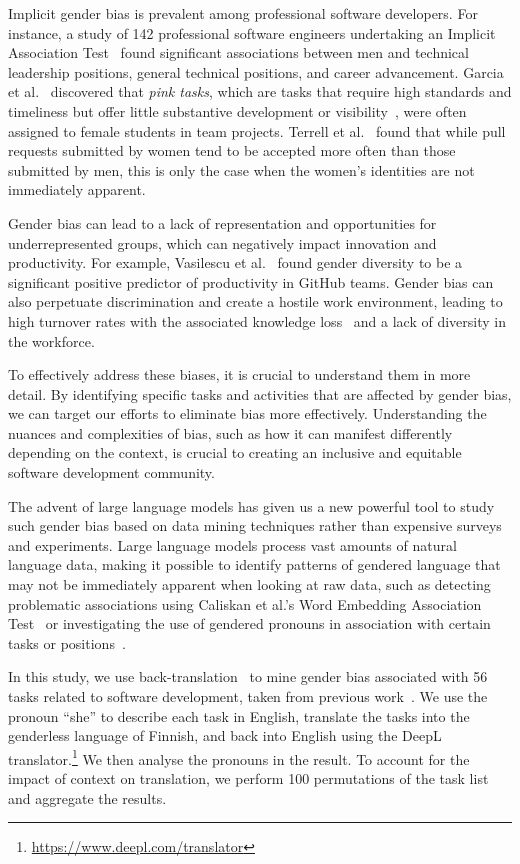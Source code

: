\documentclass[10pt,conference]{IEEEtran}
\begin{document}
\begin{sloppy}
Implicit gender bias is prevalent among professional software developers. For instance, a study of 142 professional software engineers undertaking an Implicit Association Test~\cite{wang2019implicit} found significant associations between men and technical leadership positions, general technical positions, and career advancement. Garcia et al.~\cite{garcia2022gender} discovered that \textit{pink tasks}, which are tasks that require high standards and timeliness but offer little substantive development or visibility~\cite{brough2011women}, were often assigned to female students in team projects. Terrell et al.~\cite{terrell2017gender} found that while pull requests submitted by women tend to be accepted more often than those submitted by men, this is only the case when the women's identities are not immediately apparent.

Gender bias can lead to a lack of representation and opportunities for underrepresented groups, which can negatively impact innovation and productivity. For example, Vasilescu et al.~\cite{vasilescu2015gender} found gender diversity to be a significant positive predictor of productivity in GitHub teams. Gender bias can also perpetuate discrimination and create a hostile work environment, leading to high turnover rates with the associated knowledge loss~\cite{robillard2021turnover} and a lack of diversity in the workforce. 

To effectively address these biases, it is crucial to understand them in more detail. By identifying specific tasks and activities that are affected by gender bias, we can target our efforts to eliminate bias more effectively. Understanding the nuances and complexities of bias, such as how it can manifest differently depending on the context, is crucial to creating an inclusive and equitable software development community.

The advent of large language models has given us a new powerful tool to study such gender bias based on data mining techniques rather than expensive surveys and experiments. Large language models process vast amounts of natural language data, making it possible to identify patterns of gendered language that may not be immediately apparent when looking at raw data, such as detecting problematic associations using Caliskan et al.'s Word Embedding Association Test~\cite{caliskan2017semantics} or investigating the use of gendered pronouns in association with certain tasks or positions~\cite{bordia2019identifying}. 

In this study, we use back-translation~\cite{prabhumoye2018style} to mine gender bias associated with 56 tasks related to software development, taken from previous work~\cite{masood2022like}. We use the pronoun ``she'' to describe each task in English, translate the tasks into the genderless language of Finnish, and back into English using the DeepL translator.\footnote{\url{https://www.deepl.com/translator}} We then analyse the pronouns in the result. To account for the impact of context on translation, we perform 100 permutations of the task list and aggregate the results.


\end{sloppy}
\end{document}
